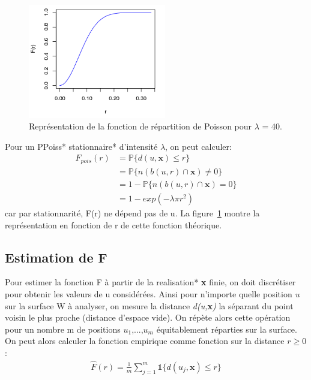 \documentclass[stage2a]{tnreport}
\begin{document}
\begin{figure}
\vspace{-0.8cm}
\begin{center}
\includegraphics[width=6cm]{figures/poisson2.png}
\caption{Représentation de la fonction de répartition de Poisson pour $\lambda$ = 40.}
\label{fig:poisson}
\end{center}
\end{figure}

Pour un \gls{PPoiss}* \gls{stationnaire}* d'intensité \begin{math}\lambda\end{math}, on peut calculer:
\begin{align*}
F_{pois}(r) &= \mathbb{P}\{d(u,\textbf{x}) \leq r\} \\
            &= \mathbb{P}\{n( b(u,r) \cap \textbf{x} ) \neq 0\} \\
            &= 1 - \mathbb{P}\{ n( b(u,r) \cap \textbf{x} ) = 0\} \\
            &= 1 - exp(-\lambda \pi r^2)
\end{align*}
car par stationnarité, F(r) ne dépend pas de u. La figure~\ref{fig:poisson} montre la représentation en fonction de r de cette fonction théorique.\\



\subsection{Estimation de F}

Pour estimer la fonction F à partir de la \gls{realisation}* \textbf{x} finie, on doit discrétiser pour obtenir les valeurs de u considérées. Ainsi pour n'importe quelle position \textit{u} sur la surface W à analyser, on mesure la distance \textit{d(u,}\textbf{x}\textit{)} la séparant du point voisin le plus proche (distance d'espace vide). On répète alors cette opération pour un nombre m de positions \begin{math}u_1\end{math},...,\begin{math}u_m\end{math} équitablement réparties sur la surface. On peut alors calculer la fonction empirique comme fonction sur la distance \begin{math} r \geq 0 \end{math}:
\begin{align*} \hat{F}(r) = \frac{1}{m}\sum_{j=1}^m \mathds{1} \{d(u_j,\textbf{x}) \leq r \}\end{align*}
\end{document}
